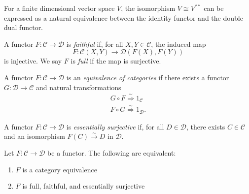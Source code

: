 \documentclass[12pt]{article}
\begin{document}
\begin{example}
	For a finite dimensional vector space $V$, the isomorphism $V\cong V^{\ast\ast}$ can be expressed as a natural equivalence between the identity functor and the double dual functor.
\end{example}

\begin{definition}
	A functor $F:\mathcal{C}\to\mathcal{D}$ is \emph{faithful} if, for all $X,Y\in\mathcal{C}$, the induced map 
	\begin{equation*}
		F:\mathcal{C}(X,Y) \to \mathcal{D}(F(X), F(Y))
	\end{equation*}
	is injective. We say $F$ is \emph{full} if the map is surjective.
\end{definition}

\begin{definition}
	A functor $F:\mathcal{C}\to\mathcal{D}$ is an \emph{equivalence of categories} if there exists a functor $G:\mathcal{D}\to\mathcal{C}$ and natural transformations 
	\begin{gather*}
		G\circ F \overset{\sim}{\Rightarrow} 1_\mathcal{C} \\
		F\circ G \overset{\sim}{\Rightarrow} 1_\mathcal{D}.
	\end{gather*}
\end{definition}

\begin{definition}
	A functor $F:\mathcal{C}\to\mathcal{D}$ is \emph{essentially surjective} if, for all $D\in\mathcal{D}$, there exists $C\in\mathcal{C}$ and an isomorphism $F(C)\overset{\sim}{\to} D$ in $\mathcal{D}$.
\end{definition}

\begin{theorem}
	Let $F:\mathcal{C}\to\mathcal{D}$ be a functor. The following are equivalent:
	\begin{enumerate}
		\item $F$ is a category equivalence 
		\item $F$ is full, faithful, and essentially surjective
	\end{enumerate}
\end{theorem}
\end{document}
